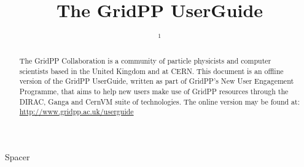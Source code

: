\documentclass[12pt,a4paper]{iopart}
\begin{document}
%
%


\title{%
The GridPP UserGuide
}

% 
\author{\theauthorinit$^{1}$}
%
\address{$^1$\theauthoraddressA}
\ead{\mailto{\theauthoremail}}

\begin{abstract}
The GridPP Collaboration is a community of particle physicists and computer
scientists based in the United Kingdom and at CERN.
This document is an offline version of the GridPP UserGuide,
written as part of GridPP's New User Engagement Programme,
that aims to help new users make use of GridPP resources
through the DIRAC, Ganga and CernVM suite of technologies.
%
The online version may be found at:
\href{http://www.gridpp.ac.uk/userguide}{http://www.gridpp.ac.uk/userguide}
\end{abstract}
%

{\color{white}Spacer}
\\[6cm]





\newpage

\setcounter{tocdepth}{1}
\tableofcontents
\newpage

\setcounter{section}{-1}


\clearpage


\clearpage


\clearpage


\clearpage


\clearpage


\clearpage


\clearpage


\clearpage


\clearpage


\clearpage


\begin{appendices}

\end{appendices}
\end{document}
